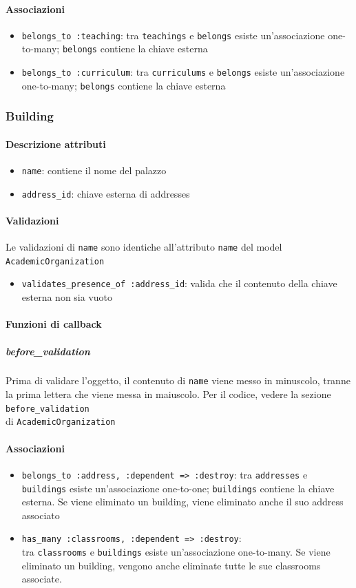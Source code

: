 \documentclass[11pt,a4paper]{article}
\begin{document}
\paragraph{Associazioni}
\begin{itemize}
 \item \verb|belongs_to :teaching|: tra \verb|teachings| e \verb|belongs| esiste un'associazione one-to-many; \verb|belongs| contiene la chiave esterna
 \item \verb|belongs_to :curriculum|: tra \verb|curriculums| e \verb|belongs| esiste un'associazione one-to-many; \verb|belongs| contiene la chiave esterna 	
\end{itemize}
\subsubsection{Building}
\paragraph{Descrizione attributi}
\begin{itemize}
 \item \verb|name|: contiene il nome del palazzo
 \item \verb|address_id|: chiave esterna di addresses	
\end{itemize}
\paragraph{Validazioni}
Le validazioni di \verb|name| sono identiche all'attributo \verb|name| del model \verb|AcademicOrganization|
\begin{itemize}
 \item \verb|validates_presence_of :address_id|: valida che il contenuto della chiave esterna non sia vuoto
\end{itemize}
\paragraph{Funzioni di callback}
\subparagraph{before\_validation}
Prima di validare l'oggetto, il contenuto di \verb|name| viene messo in minuscolo, tranne la prima lettera che viene messa in maiuscolo. Per il codice, vedere la sezione \verb|before_validation|\\ di \verb|AcademicOrganization| 
\paragraph{Associazioni}
\begin{itemize}
 \item \verb|belongs_to :address, :dependent => :destroy|: tra \verb|addresses| e \verb|buildings| esiste un'associazione one-to-one; \verb|buildings| contiene la chiave esterna. Se viene eliminato un building, viene eliminato anche il suo address associato
 \item \verb|has_many :classrooms, :dependent => :destroy|:\\ tra \verb|classrooms| e \verb|buildings| esiste un'associazione one-to-many. Se viene eliminato un building, vengono anche eliminate tutte le sue classrooms associate.
\end{itemize}
\end{document}
